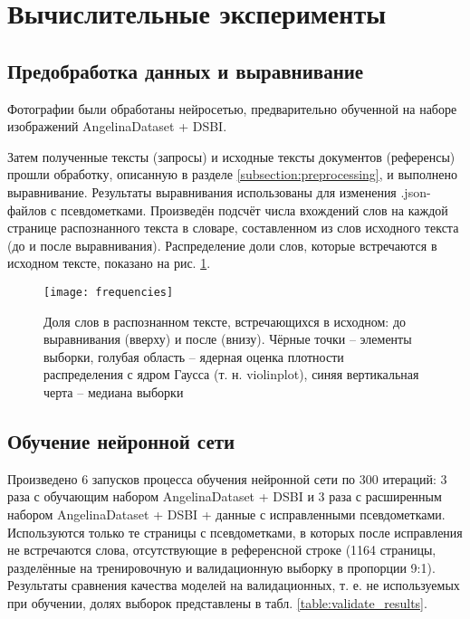 \documentclass{main.tex}[subfiles]
\begin{document}
\newpage
\section{Вычислительные эксперименты}
\subsection{Предобработка данных и выравнивание}

Фотографии были обработаны нейросетью, предварительно обученной на наборе изображений AngelinaDataset + DSBI.

Затем полученные тексты (запросы) и исходные тексты документов (референсы) прошли обработку, описанную в разделе \ref{subsection:preprocessing}, и выполнено выравнивание.
Результаты выравнивания использованы для изменения .json-файлов с псевдометками.
Произведён подсчёт числа вхождений слов на каждой странице распознанного текста в словаре, составленном из слов исходного текста (до и после выравнивания).
Распределение доли слов, которые встречаются в исходном тексте, показано на рис. \ref{fig:frequencies}.

\begin{figure}[H]
    \centering
    \texttt{[image: frequencies]}
    \caption{Доля слов в распознанном тексте, встречающихся в исходном: до выравнивания (вверху) и после (внизу). Чёрные точки -- элементы выборки, голубая область -- ядерная оценка плотности распределения с ядром Гаусса (т. н. violinplot), синяя вертикальная черта -- медиана выборки}
    \label{fig:frequencies}
\end{figure}

\subsection{Обучение нейронной сети}

Произведено 6 запусков процесса обучения нейронной сети по 300 итераций: 3 раза с обучающим набором AngelinaDataset + DSBI и 3 раза с расширенным набором AngelinaDataset + DSBI + данные с исправленными псевдометками.
Используются только те страницы с псевдометками, в которых после исправления не встречаются слова, отсутствующие в референсной строке (1164 страницы, разделённые на тренировочную и валидационную выборку в пропорции 9:1).
Результаты сравнения качества моделей на валидационных, т. е. не используемых при обучении, долях выборок представлены в табл. \ref{table:validate_results}.
\end{document}
